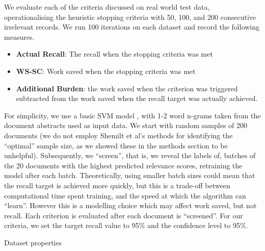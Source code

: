 \documentclass{bmcart}
\providecommand{\DIFadd}[1]{{\protect\color{blue} \sf #1}} %
\providecommand{\DIFaddbegin}{} %
\providecommand{\DIFaddend}{} %
\providecommand{\DIFaddbeginFL}{} %
\providecommand{\DIFaddendFL}{} %
\providecommand{\DIFdelbeginFL}{} %
\providecommand{\DIFdelendFL}{} %
\newcommand{\DIFscaledelfig}{0.5}
\newlength{\DIFdelgraphicswidth} %
\newlength{\DIFdelgraphicsheight} %
\newcommand{\DIFaddincludegraphics}[2][]{{\color{blue}\fbox{\DIFOincludegraphics[#1]{#2}}}} %
\newcommand{\DIFdelincludegraphics}[2][]{%
\sbox{\DIFdelgraphicsbox}{\DIFOincludegraphics[#1]{#2}}%
\settoboxwidth{\DIFdelgraphicswidth}{\DIFdelgraphicsbox} %
\settoboxtotalheight{\DIFdelgraphicsheight}{\DIFdelgraphicsbox} %
\scalebox{\DIFscaledelfig}{%
\parbox[b]{\DIFdelgraphicswidth}{\usebox{\DIFdelgraphicsbox}\\[-\baselineskip] \rule{\DIFdelgraphicswidth}{0em}}\llap{\resizebox{\DIFdelgraphicswidth}{\DIFdelgraphicsheight}{%
\setlength{\unitlength}{\DIFdelgraphicswidth}%
\begin{picture}(1,1)%
\thicklines\linethickness{2pt} %
{\color[rgb]{1,0,0}\put(0,0){\framebox(1,1){}}}%
{\color[rgb]{1,0,0}\put(0,0){\line( 1,1){1}}}%
{\color[rgb]{1,0,0}\put(0,1){\line(1,-1){1}}}%
\end{picture}%
}\hspace*{3pt}}} %
} %
\DeclareRobustCommand{\DIFaddbegin}{\DIFOaddbegin \let\includegraphics\DIFaddincludegraphics} %
\DeclareRobustCommand{\DIFaddend}{\DIFOaddend \let\includegraphics\DIFOincludegraphics} %
\DeclareRobustCommand{\DIFaddbeginFL}{\DIFOaddbeginFL \let\includegraphics\DIFaddincludegraphics} %
\DeclareRobustCommand{\DIFaddendFL}{\DIFOaddendFL \let\includegraphics\DIFOincludegraphics} %
\DeclareRobustCommand{\DIFdelbeginFL}{\DIFOdelbeginFL \let\includegraphics\DIFdelincludegraphics} %
\DeclareRobustCommand{\DIFdelendFL}{\DIFOaddendFL \let\includegraphics\DIFOincludegraphics} %
\begin{document}
	We evaluate each of the criteria discussed on real world test data, operationalising the heuristic stopping criteria with 50, 100, and 200 consecutive irrelevant records. We run 100 iterations on each dataset and record the following measures.
	\begin{itemize}
		\item \textbf{Actual Recall}: The recall when the stopping criteria was met
		\item \textbf{WS-SC}: Work saved when the stopping criteria was met
		\item \textbf{Additional Burden}: the work saved when the criterion was triggered subtracted from the work saved when the recall target was actually achieved.

	\end{itemize}
	For simplicity, we use a basic SVM model \cite{Cortes95, Pedregosa2011}, with 1-2 word n-grams taken from the document abstracts used as input data. We start with random samples of 200 documents (we do not employ Shemilt et al's methods for identifying the ``optimal'' sample size, as we showed these in the methods section to be unhelpful). Subsequently, we ``screen'', that is, we reveal the labels of, batches of the 20 documents with the highest predicted relevance scores, retraining the model after each batch. \DIFaddbegin \DIFadd{Theoretically, using smaller batch sizes could mean that the recall target is achieved more quickly, but this is a trade-off between computational time spent training, and the speed at which the algorithm can ``learn''. However this is a modelling choice which may affect work saved, but not recall. }\DIFaddend Each criterion is evaluated after each document is ``screened''.
	For our criteria, we set the target recall value to 95\% and the confidence level to 95\%.

	
	\begin{table}
		\DIFdelbeginFL %
\DIFdelendFL \DIFaddbeginFL 
		\DIFaddendFL \caption{Dataset properties}
		\label{tab:data}
	\end{table}
\end{document}
